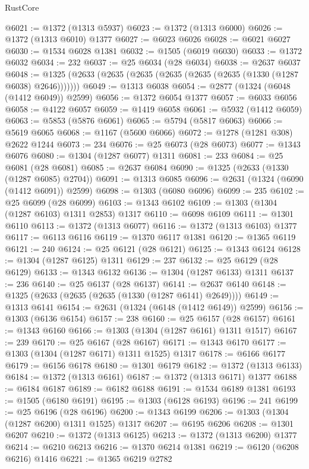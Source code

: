 \begin{lexlean}{RustCore}
\begin{coremodule}
@6021 := @1372 (@1313 @5937)
@6023 := @1372 (@1313 @6000)
@6026 := @1372 (@1313 @6010) @1377
@6027 := @6023 @6026
@6028 := @6021 @6027
@6030 := @1534 @6028 @1381
@6032 := @1505 (@6019 @6030)
@6033 := @1372 @6032
@6034 := 232
@6037 := @25 @6034 (@28 @6034)
@6038 := @2637 @6037
@6048 := @1325 (@2633 (@2635 (@2635 (@2635 (@2635 (@2635 (@1330 (@1287 @6038) @2646)))))))
@6049 := @1313 @6038
@6054 := @2877 (@1324 (@6048 (@1412 @6049)) @2599)
@6056 := @1372 @6054 @1377
@6057 := @6033 @6056
@6058 := @4122 @6057
@6059 := @1419 @6058
@6061 := @5932 (@1412 @6059)
@6063 := @5853 (@5876 @6061)
@6065 := @5794 (@5817 @6063)
@6066 := @5619 @6065
@6068 := @1167 (@5600 @6066)
@6072 := @1278 (@1281 @308) @2622 @1244
@6073 := 234
@6076 := @25 @6073 (@28 @6073)
@6077 := @1343 @6076
@6080 := @1304 (@1287 @6077) @1311
@6081 := 233
@6084 := @25 @6081 (@28 @6081)
@6085 := @2637 @6084
@6090 := @1325 (@2633 (@1330 (@1287 @6085) @2704))
@6091 := @1313 @6085
@6096 := @2631 (@1324 (@6090 (@1412 @6091)) @2599)
@6098 := @1303 (@6080 @6096)
@6099 := 235
@6102 := @25 @6099 (@28 @6099)
@6103 := @1343 @6102
@6109 := @1303 (@1304 (@1287 @6103) @1311 @2853) @1317
@6110 := @6098 @6109
@6111 := @1301 @6110
@6113 := @1372 (@1313 @6077)
@6116 := @1372 (@1313 @6103) @1377
@6117 := @6113 @6116
@6119 := @1370 @6117 @1381
@6120 := @1365 @6119
@6121 := 240
@6124 := @25 @6121 (@28 @6121)
@6125 := @1343 @6124
@6128 := @1304 (@1287 @6125) @1311
@6129 := 237
@6132 := @25 @6129 (@28 @6129)
@6133 := @1343 @6132
@6136 := @1304 (@1287 @6133) @1311
@6137 := 236
@6140 := @25 @6137 (@28 @6137)
@6141 := @2637 @6140
@6148 := @1325 (@2633 (@2635 (@2635 (@1330 (@1287 @6141) @2649))))
@6149 := @1313 @6141
@6154 := @2631 (@1324 (@6148 (@1412 @6149)) @2599)
@6156 := @1303 (@6136 @6154)
@6157 := 238
@6160 := @25 @6157 (@28 @6157)
@6161 := @1343 @6160
@6166 := @1303 (@1304 (@1287 @6161) @1311 @1517)
@6167 := 239
@6170 := @25 @6167 (@28 @6167)
@6171 := @1343 @6170
@6177 := @1303 (@1304 (@1287 @6171) @1311 @1525) @1317
@6178 := @6166 @6177
@6179 := @6156 @6178
@6180 := @1301 @6179
@6182 := @1372 (@1313 @6133)
@6184 := @1372 (@1313 @6161)
@6187 := @1372 (@1313 @6171) @1377
@6188 := @6184 @6187
@6189 := @6182 @6188
@6191 := @1534 @6189 @1381
@6193 := @1505 (@6180 @6191)
@6195 := @1303 (@6128 @6193)
@6196 := 241
@6199 := @25 @6196 (@28 @6196)
@6200 := @1343 @6199
@6206 := @1303 (@1304 (@1287 @6200) @1311 @1525) @1317
@6207 := @6195 @6206
@6208 := @1301 @6207
@6210 := @1372 (@1313 @6125)
@6213 := @1372 (@1313 @6200) @1377
@6214 := @6210 @6213
@6216 := @1370 @6214 @1381
@6219 := @6120 (@6208 @6216) @1416
@6221 := @1365 @6219 @2782

\end{coremodule}
\end{lexlean}
